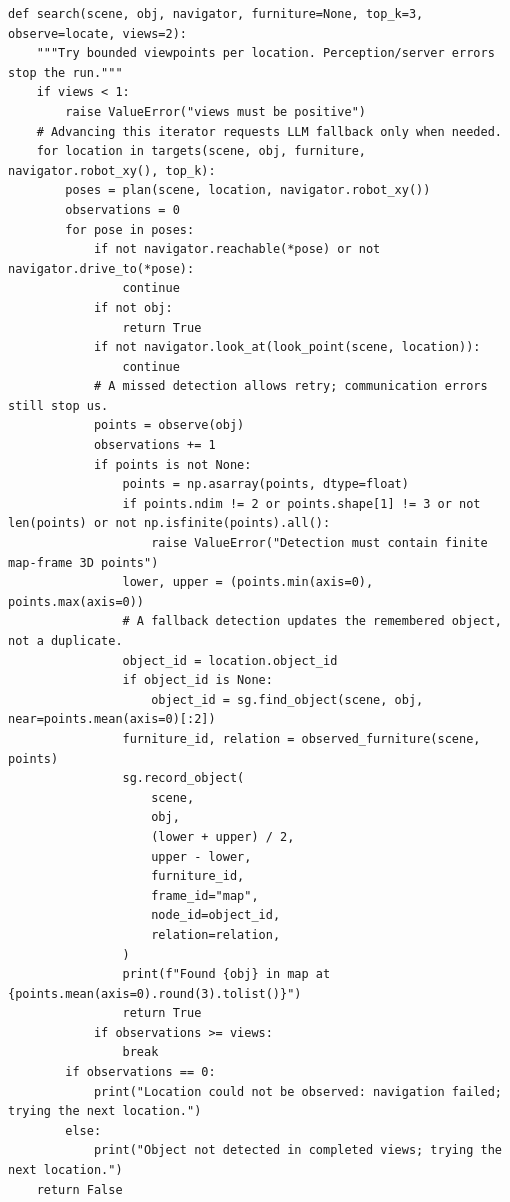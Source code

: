 \documentclass[11pt,a4paper]{book}
\begin{document}
\begin{lstlisting}
def search(scene, obj, navigator, furniture=None, top_k=3, observe=locate, views=2):
    """Try bounded viewpoints per location. Perception/server errors stop the run."""
    if views < 1:
        raise ValueError("views must be positive")
    # Advancing this iterator requests LLM fallback only when needed.
    for location in targets(scene, obj, furniture, navigator.robot_xy(), top_k):
        poses = plan(scene, location, navigator.robot_xy())
        observations = 0
        for pose in poses:
            if not navigator.reachable(*pose) or not navigator.drive_to(*pose):
                continue
            if not obj:
                return True
            if not navigator.look_at(look_point(scene, location)):
                continue
            # A missed detection allows retry; communication errors still stop us.
            points = observe(obj)
            observations += 1
            if points is not None:
                points = np.asarray(points, dtype=float)
                if points.ndim != 2 or points.shape[1] != 3 or not len(points) or not np.isfinite(points).all():
                    raise ValueError("Detection must contain finite map-frame 3D points")
                lower, upper = (points.min(axis=0), points.max(axis=0))
                # A fallback detection updates the remembered object, not a duplicate.
                object_id = location.object_id
                if object_id is None:
                    object_id = sg.find_object(scene, obj, near=points.mean(axis=0)[:2])
                furniture_id, relation = observed_furniture(scene, points)
                sg.record_object(
                    scene,
                    obj,
                    (lower + upper) / 2,
                    upper - lower,
                    furniture_id,
                    frame_id="map",
                    node_id=object_id,
                    relation=relation,
                )
                print(f"Found {obj} in map at {points.mean(axis=0).round(3).tolist()}")
                return True
            if observations >= views:
                break
        if observations == 0:
            print("Location could not be observed: navigation failed; trying the next location.")
        else:
            print("Object not detected in completed views; trying the next location.")
    return False



\end{lstlisting}
\end{document}

